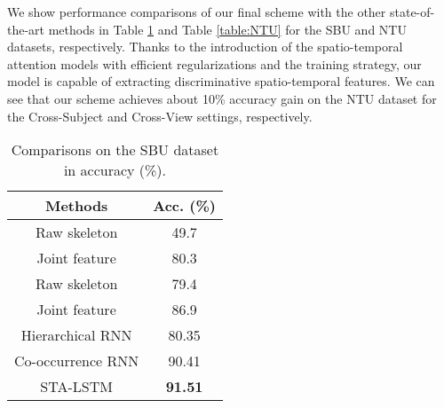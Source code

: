 \documentclass[letterpaper]{article}
\begin{document}
We show performance comparisons of our final scheme with the other state-of-the-art methods in Table \ref{table:SBU} and Table \ref{table:NTU} for the SBU and NTU datasets, respectively. Thanks to the introduction of the spatio-temporal attention models with efficient regularizations and the training strategy, our model is capable of extracting discriminative spatio-temporal features. We can see that our scheme achieves about 10\% accuracy gain on the NTU dataset for the Cross-Subject and Cross-View settings, respectively.
\begin{table}[htbp]
\vspace{-3mm}
	\fontsize{8pt}{9pt}\selectfont\centering
	\begin{center}
		\caption{Comparisons on the SBU dataset in accuracy (\%).} \label{table:SBU}
		\vspace{-2mm}
		\begin{tabular}{c|c}
			\hline
			Methods & Acc. (\%) \\
			\hline
			Raw skeleton \cite{yun2012two} & 49.7 \\
			\hline
			Joint feature \cite{yun2012two} & 80.3 \\
			\hline
			Raw skeleton \cite{ji2014interactive} & 79.4 \\
			\hline
			Joint feature \cite{ji2014interactive} & 86.9 \\
			\hline
			Hierarchical RNN \cite{CVPR15HRNN} & 80.35 \\
			\hline
			Co-occurrence RNN \cite{zhu2015co} & 90.41 \\
			\hline
\hline
			STA-LSTM & \textbf{91.51} \\
			\hline
		\end{tabular}
	\end{center}
\vspace{-8mm}
\end{table}
\end{document}
